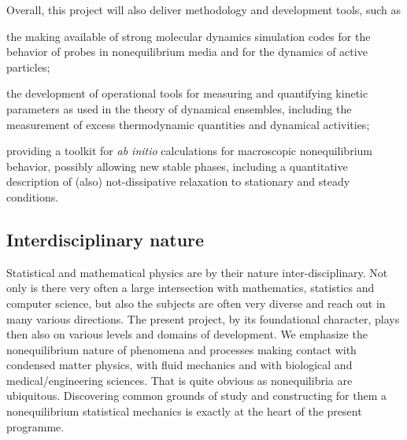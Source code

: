 Overall, this project will also deliver methodology and development tools, such as
\begin{inparaenum}[A.]
	\item the making available of strong molecular dynamics simulation codes for the behavior of
	probes in nonequilibrium media and for the dynamics of active particles;
	\item the development of operational tools for measuring and quantifying kinetic parameters
	as used in the theory of dynamical ensembles, including the measurement of excess
	thermodynamic quantities and dynamical activities;
	\item providing a toolkit for {\it ab initio} calculations for macroscopic nonequilibrium
	behavior, possibly allowing new stable phases, including a quantitative description of
	(also) not-dissipative relaxation to stationary and steady conditions.
\end{inparaenum}


\subsection{Interdisciplinary nature}\label{sec:interdisc}


Statistical and mathematical physics are by their nature inter-disciplinary.  Not
only is there very often a large intersection with mathematics, statistics and computer
science, but also the subjects are often very diverse and reach out in many various
directions.  The present project, by its foundational character, plays then also on various levels and domains of development. We emphasize the nonequilibrium nature of
phenomena and processes making contact with condensed matter physics, with
fluid mechanics and with biological and medical/engineering sciences.  That is quite obvious
as nonequilibria are ubiquitous.  Discovering common grounds of study and constructing for
them a nonequilibrium statistical mechanics is exactly  at the heart of the present programme.

